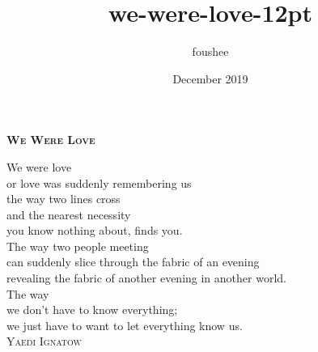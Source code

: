 \documentclass[20pt]{memoir}
\title{we-were-love-12pt}
\author{foushee }
\date{December 2019}
\begin{document}
\thispagestyle{empty}
\textbf{\textsc{\large We Were Love}}
\vspace{26pt}

We were love\\
or love was suddenly remembering us\\
the way two lines cross\\
and the nearest necessity\\
you know nothing about, finds you.\\
The way two people meeting\\
can suddenly slice through the fabric of an evening\\
revealing the fabric of another evening in another world.\\
The way\\
we don’t have to know everything;\\
we just have to want to let everything know us.\\

\vspace{11pt}
\hspace{90pt} \textsc{Yaedi Ignatow}\\
\vfill
\end{document}
